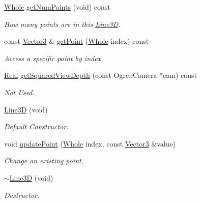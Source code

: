 \begin{DoxyCompactItemize}
\hyperlink{namespaceMezzanine_adcbb6ce6d1eb4379d109e51171e2e493}{Whole} \hyperlink{classMezzanine_1_1internal_1_1Line3D_a646e172f64f5563022f05ba5aa3839f9}{getNumPoints} (void) const 
\begin{DoxyCompactList}\small\item\em How many points are in this \hyperlink{classMezzanine_1_1internal_1_1Line3D}{Line3D}. \item\end{DoxyCompactList}\item 
const \hyperlink{classMezzanine_1_1Vector3}{Vector3} \& \hyperlink{classMezzanine_1_1internal_1_1Line3D_a560292248853b723f9f480205bc0a35f}{getPoint} (\hyperlink{namespaceMezzanine_adcbb6ce6d1eb4379d109e51171e2e493}{Whole} index) const 
\begin{DoxyCompactList}\small\item\em Access a specific point by index. \item\end{DoxyCompactList}\item 
\hyperlink{namespaceMezzanine_a726731b1a7df72bf3583e4a97282c6f6}{Real} \hyperlink{classMezzanine_1_1internal_1_1Line3D_a1ead55e5f68b2bb2421af64b1ce2a83e}{getSquaredViewDepth} (const Ogre::Camera $\ast$cam) const 
\begin{DoxyCompactList}\small\item\em Not Used. \item\end{DoxyCompactList}\item 
\hyperlink{classMezzanine_1_1internal_1_1Line3D_a9b5b0aa76e55b8aa3030fe9833b81cc0}{Line3D} (void)
\begin{DoxyCompactList}\small\item\em Default Constructor. \item\end{DoxyCompactList}\item 
void \hyperlink{classMezzanine_1_1internal_1_1Line3D_ad2abff4e6297613e3a116c8f3f931442}{updatePoint} (\hyperlink{namespaceMezzanine_adcbb6ce6d1eb4379d109e51171e2e493}{Whole} index, const \hyperlink{classMezzanine_1_1Vector3}{Vector3} \&value)
\begin{DoxyCompactList}\small\item\em Change an existing point. \item\end{DoxyCompactList}\item 
\hyperlink{classMezzanine_1_1internal_1_1Line3D_a3a0edfa3660255f7d00762e704f73ea7}{$\sim$Line3D} (void)
\begin{DoxyCompactList}\small\item\em Destructor. \item\end{DoxyCompactList}\end{DoxyCompactItemize}
